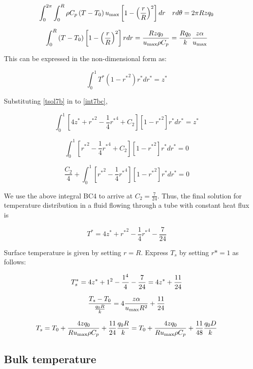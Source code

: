 \begin{equation}
\label{tsol7c1}
\int_{0}^{2\pi}{ \int_{0}^{R}{ \rho C_p \left(T-T_0\right) u_{\text{max}} \left[1 - \left(\frac{r}{R}\right)^2\right]  dr}\quad rd\theta} = 2 \pi R z q_0
\end{equation}

$$
\int_{0}^{R}{ \left(T-T_0\right) \left[1 - \left(\frac{r}{R}\right)^2\right] r dr} = \frac{R z q_0}{u_{\text{max}} \rho C_p} = \frac{R q_0}{k} \frac{z \alpha}{u_{\text{max}}}
$$


This can be expressed in the non-dimensional form as:

\begin{equation}
\label{int7bc}
\int_{0}^{1}{ T^* (1-{r^*}^2) r^* dr^*} = z^*
\end{equation}

Substituting \ref{tsol7b} in to \ref{int7bc},

$$
\int_{0}^{1}{\left[4 z^* + {r^*}^2  - \frac{1}{4} {r^*}^4  + C_2 \right] \left[ 1-{r^*}^2 \right] r^* d r^*} = z^*
$$

$$
\int_{0}^{1}{\left[{r^*}^2  - \frac{1}{4} {r^*}^4  + C_2 \right] \left[ 1-{r^*}^2 \right] r^* d r^*} = 0
$$

$$
\frac{C_2}{4} + \int_{0}^{1}{\left[{r^*}^2  - \frac{1}{4} {r^*}^4  \right] \left[ 1-{r^*}^2 \right] r^* d r^*} = 0
$$

We use the above integral BC4 to arrive at $C_2 = \frac{7}{24}$. Thus, the final solution for temperature distribution in a fluid flowing through a tube with constant heat flux is

$$
\boxed{
T^* = 4 z^* + {r^*}^2  - \frac{1}{4} {r^*}^4  - \frac{7}{24} 
}
$$

Surface temperature is given by setting $r=R$. Express $T_s$ by setting $r* = 1$ as follows:

$$ T_s^* = 4 z^* + 1^2 - {1^4 \over 4} - {7 \over 24} = 4 z^* + {11 \over 24}$$

$$ {T_s - T_0 \over {q_0 R \over k}} = 4 {z \alpha \over u_\text{max} R^2 } + {11 \over 24}$$

\begin{equation}
\label{tstb1}
 T_s = T_0 + {4 z q_0 \over R u_\text{max} \rho C_p} + {11 \over 24} {q_0 R \over k} = T_0 + {4 z q_0 \over R u_\text{max} \rho C_p} + {11 \over 48} {q_0 D \over k} 
\end{equation}



\subsection{Bulk temperature}

